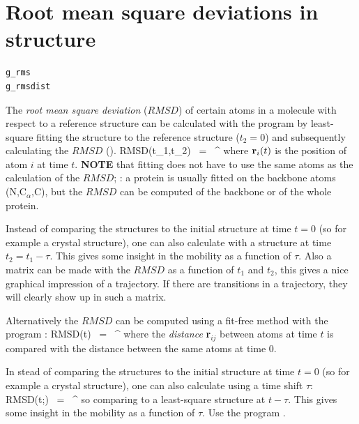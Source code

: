 
\section{Root mean square deviations in structure}
\label{sec:rmsd}
\begin{verbatim}
g_rms
g_rmsdist
\end{verbatim}
The {\em root mean square deviation} ($RMSD$) of certain atoms in a molecule
with respect to a reference structure can be calculated with the program 
{\tt {}} by least-square fitting the structure to the reference structure
($t_2 = 0$) and subsequently calculating the $RMSD$ ().
\beq
RMSD(t_1,t_2) ~=~ \left[\frac{1}{N} \sum_{i=1}^N \|{\bf r}_i(t_1)-{\bf r}_i(t_2)\|^2 \right]^{}
\label{eqn:rmsd}
\eeq
where ${\bf r}_i(t)$ is the position of atom $i$ at time $t$.
{\bf NOTE} that fitting does not have to use the same atoms as the calculation
of the $RMSD$; {\eg}: a protein is usually fitted on the backbone atoms
(N,C$_{\alpha}$,C), but the $RMSD$ can be computed of the backbone
or of the whole protein.

Instead of comparing the structures to the initial structure at time $t=0$ 
(so for example a crystal structure), one can also calculate  
with a structure at time $t_2=t_1-\tau$.
This gives some insight in the mobility as a function of $\tau$.
Also a matrix can be made with the $RMSD$ as a function of $t_1$ and $t_2$,
this gives a nice graphical impression of a trajectory.
If there are transitions in a trajectory, they will clearly show up in
such a matrix.

Alternatively the $RMSD$ can be computed using a fit-free method with the 
program {\tt {}}:
\beq
RMSD(t) ~=~     \left[\frac{1}{N^2}\sum_{i=1}^N \sum_{j=1}^N    \|{\bf r}_{ij}(t)-{\bf r}_{ij}(0)\|^2\right]^{}
\label{eqn:rmsdff}
\eeq
where the {\em distance} {\bf r}$_{ij}$ between atoms at time $t$ 
is compared with the distance between the same atoms at time $0$.

In stead of comparing the structures to the initial structure at time $t=0$ 
(so for example a crystal structure), one can also calculate  
using a time shift $\tau$:
\beq
RMSD(t;\tau) ~=~ \left[\frac{1}{N} \sum_{i=1}^N \|{\bf r}_i(t)-{\bf r}_i(t-\tau)\|^2 \right]^{}
\label{eqn:rmdstau}
\eeq
so comparing to a least-square structure at $t-\tau$. This gives some insight 
in the mobility as a function of $\tau$. Use the program {\tt {}}.

